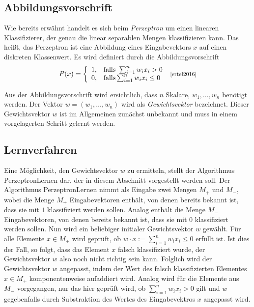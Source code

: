 \documentclass[fontsize=11pt]{scrartcl}
\begin{document}
            \subsection{Abbildungsvorschrift}
                Wie bereits erwähnt handelt es sich beim \emph{Perzeptron} um einen linearen Klassifizierer, der genau die linear separablen Mengen klassifizieren kann. Das heißt, das Perzeptron ist eine Abbildung eines Eingabevektors $x$ auf einen diskreten Klassenwert. Es wird definiert durch die Abbildungsvorschrift
                $$
                    P(x)=\left\{\begin{array}{cl} 1, & \mbox{falls }\sum_{i=1}^nw_ix_i > 0\\ 0, & \mbox{falls} \sum_{i=1}^n w_ix_i \leq 0 \end{array}\right. \text{ \footnotesize\cite[S.201]{ertel2016}} 
                $$

                Aus der Abbildungsvorschrift wird ersichtlich, dass $n$ Skalare, $w_1,\dots,w_n$ benötigt werden. Der Vektor $w = (w_1,\dots, w_n)$ wird als \emph{Gewichtsvektor} bezeichnet. Dieser Gewichtsvektor $w$ ist im Allgemeinen zunächst unbekannt und muss in einem vorgelagerten Schritt gelernt werden.

            \subsection{Lernverfahren}
                Eine Möglichkeit, den Gewichtsvektor $w$ zu ermitteln, stellt der Algorithmus PerzeptronLernen dar, der in diesem Abschnitt vorgestellt werden soll. Der Algorithmus PerzeptronLernen nimmt als Eingabe zwei Mengen $M_+$ und $M_-$, wobei die Menge $M_+$ Eingabevektoren enthält, von denen bereits bekannt ist, dass sie mit $1$ klassifiziert werden sollen. Analog enthält die Menge $M_-$ Eingabevektoren, von denen bereits bekannt ist, dass sie mit $0$ klassifiziert werden sollen.
                \newline
                Nun wird ein beliebiger initialer Gewichtsvektor $w$ gewählt.
                \newline
                Für alle Elemente $x \in M_+$ wird geprüft, ob $w \cdot x := \sum_{i=1}^nw_ix_i \leq 0$ erfüllt ist. Ist dies der Fall, so folgt, dass das Element $x$ falsch klassifiziert wurde, der Gewichtsvektor $w$ also noch nicht richtig sein kann. Folglich wird der Gewichtsvektor $w$ angepasst, indem der Wert des falsch klassifizierten Elementes $x \in M_+$ komponentenweise aufaddiert wird.
                \newline
                Analog wird für die Elemente aus $M_-$ vorgegangen, nur das hier geprüft wird, ob $\sum_{i=1}^nw_ix_i > 0$ gilt und $w$ gegebenfalls durch Substraktion des Wertes des Eingabevektros $x$ angepasst wird.
\end{document}

